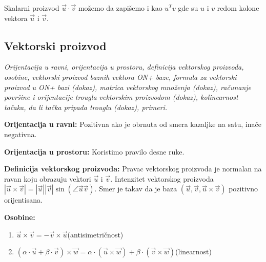 \documentclass[12pt]{article}
\newcommand{\vek}[1]{\overrightarrow{#1}}
\begin{document}
Skalarni proizvod $\vek{u}\cdot\vek{v}$ možemo da zapišemo i kao $u^Tv$ gde su
$u$ i $v$ redom kolone vektora $\vek{u}$ i $\vek{v}$.
\par

\subsection{Vektorski proizvod}
\textit{Orijentacija u ravni, orijentacija u prostoru, definicija vektorskog
    proizvoda, osobine, vektorski proizvod baznih vektora ON+ baze, formula za
    vektorski proizvod u ON+ bazi (dokaz), matrica vektorskog množenja (dokaz),
    računanje površine i orijentacije trougla vektorskim proizvodom (dokaz),
    kolinearnost tačaka, da li tačka pripada trouglu (dokaz), primeri.}
\par
\vspace*{1cm}

\textbf{Orijentacija u ravni:} Pozitivna ako je obrnuta od smera kazaljke na
satu, inače negativna.
\par

\textbf{Orijentacija u prostoru:} Koristimo pravilo desne ruke.
\par

\textbf{Definicija vektorskog proizvoda:} Pravac vektorskog proizvoda je
normalan na ravan koju obrazuju vektori $\vek{u}$ i $\vek{v}$. Intenzitet
vektorskog proizvoda $|\vek{u}\times\vek{v}|=|\vek{u}||\vek{v}|
    \sin(\angle\vek{u}\vek{v})$. Smer je takav da je baza
$(\vek{u},\vek{v},\vek{u}\times\vek{v})$ pozitivno orijentisana.
\par

\textbf{Osobine:}
\begin{enumerate}[label=\textit{\arabic*)}]
    \item $\vek{u}\times\vek{v}=-\vek{v}\times\vek{u}$\hspace*{1cm}(antisimetričnost)
    \item $(\alpha\cdot\vek{u}+\beta\cdot\vek{v})\times\vek{w}=\alpha\cdot(\vek{u}\times\vek{w})+\beta\cdot(\vek{v}\times\vek{w})$\hspace*{1cm}(linearnost)
\end{enumerate}
\par
\end{document}
